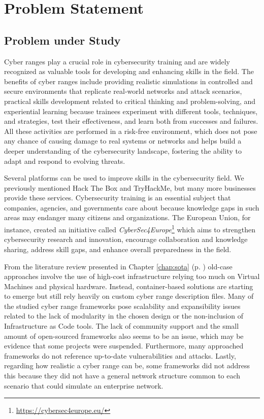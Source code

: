 \chapter{Problem Statement}\label{chap:problem_statement}

\minitoc

\section{Problem under Study} \label{sec:research_problem}

Cyber ranges play a crucial role in cybersecurity training and are widely recognized as valuable tools for developing and enhancing skills in the field. The benefits of cyber ranges include providing realistic simulations in controlled and secure environments that replicate real-world networks and attack scenarios, practical skills development related to critical thinking and problem-solving, and experiential learning because trainees experiment with different tools, techniques, and strategies, test their effectiveness, and learn both from successes and failures. All these activities are performed in a risk-free environment, which does not pose any chance of causing damage to real systems or networks and helps build a deeper understanding of the cybersecurity landscape, fostering the ability to adapt and respond to evolving threats. 

Several platforms can be used to improve skills in the cybersecurity field. We previously mentioned Hack The Box and TryHackMe, but many more businesses provide these services. Cybersecurity training is an essential subject that companies, agencies, and governments care about because knowledge gaps in such areas may endanger many citizens and organizations. The European Union, for instance, created an initiative called \textit{CyberSec4Europe}\footnote{\url{https://cybersec4europe.eu/}} which aims to strengthen cybersecurity research and innovation, encourage collaboration and knowledge sharing, address skill gaps, and enhance overall preparedness in the field. 

From the literature review presented in Chapter \ref{chap:sota} (p. \pageref{chap:sota}) old-case approaches involve the use of high-cost infrastructure relying too much on Virtual Machines and physical hardware. Instead, container-based solutions are starting to emerge but still rely heavily on custom cyber range description files. Many of the studied cyber range frameworks pose scalability and expansibility issues related to the lack of modularity in the chosen design or the non-inclusion of Infrastructure as Code tools. The lack of community support and the small amount of open-sourced frameworks also seems to be an issue, which may be evidence that some projects were suspended. Furthermore, many approached frameworks do not reference up-to-date vulnerabilities and attacks. Lastly, regarding how realistic a cyber range can be, some frameworks did not address this because they did not have a general network structure common to each scenario that could simulate an enterprise network. 

